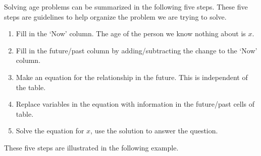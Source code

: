  Solving age problems can be summarized in the following five steps. These five
steps are guidelines to help organize the problem we are trying to solve.
\begin{enumerate}
  \item Fill in the `Now' column. The age of the person we know nothing about is $x$.
  
  \item Fill in the future/past column by adding/subtracting the change to
  the `Now' column.
  
  \item Make an equation for the relationship in the future. This is
  independent of the table.
  
  \item Replace variables in the equation with information in the future/past cells of table.
  
  \item Solve the equation for $x$, use the solution to answer the question.
\end{enumerate}
 These five steps are illustrated in the following example.


